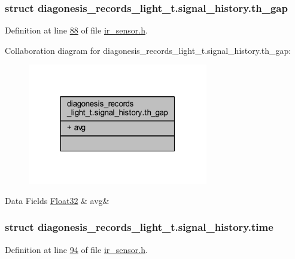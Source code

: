 \subsubsection{struct diagonesis\+\_\+records\+\_\+light\+\_\+t.\+signal\+\_\+history.\+th\+\_\+gap}


Definition at line \hyperlink{a00017_source_l00088}{88} of file \hyperlink{a00017_source}{ir\+\_\+sensor.\+h}.



Collaboration diagram for diagonesis\+\_\+records\+\_\+light\+\_\+t.\+signal\+\_\+history.\+th\+\_\+gap\+:\nopagebreak
\begin{figure}[H]
\begin{center}
\leavevmode
\includegraphics[width=223pt]{dd/dcf/a00922}
\end{center}
\end{figure}
\begin{DoxyFields}{Data Fields}
\hypertarget{a00017_ae322d423f075b0ab2daad27011d24909}{\hyperlink{a00072_a87d38f886e617ced2698fc55afa07637}{Float32}}\label{a00017_ae322d423f075b0ab2daad27011d24909}
&
avg&
\\
\hline

\end{DoxyFields}
\label{da/dee/a00383}
\hypertarget{a00017_da/dee/a00383}{}
\subsubsection{struct diagonesis\+\_\+records\+\_\+light\+\_\+t.\+signal\+\_\+history.\+time}


Definition at line \hyperlink{a00017_source_l00094}{94} of file \hyperlink{a00017_source}{ir\+\_\+sensor.\+h}.



